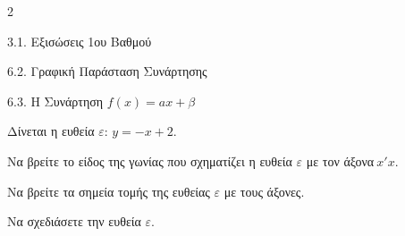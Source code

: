 
\begin{ylh}{2}
    \item 3.1. Εξισώσεις 1ου Βαθμού
    \item 6.2. Γραφική Παράσταση Συνάρτησης
    \item 6.3. Η Συνάρτηση $f(x)=ax+\beta$
\end{ylh}
Δίνεται η ευθεία $\varepsilon$: $y = - x + 2$.
\begin{alist}
\item Να βρείτε το είδος της γωνίας που σχηματίζει η ευθεία $\varepsilon$ με τον άξονα$\ x'x$.
\item Να βρείτε τα σημεία τομής της ευθείας $\varepsilon$ με τους άξονες.
\item Να σχεδιάσετε την ευθεία $\varepsilon$.
\end{alist}

